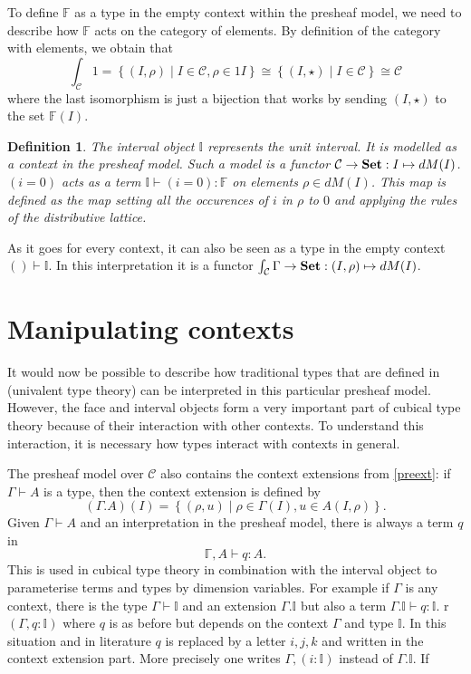 \documentclass[12pt,a4paper,twoside,xetex,draft]{book}
\newcommand{\keyword}[1]{\emph{#1}\index{#1}}
\newtheorem{definition}[theorem]{Definition}
\begin{document}
To define $\mathbb{F}$ as a type in the empty context within the presheaf model, we need to describe how $\mathbb{F}$ acts on the category of elements. By definition of the category with elements, we obtain that $$\int_{\mathcal{C}} 1 = \left\{ (I, \rho ) \mid I \in \mathcal{C}, \rho \in 1I \right\} \cong \left\{ (I, \star ) \mid I \in \mathcal{C} \right\}  \cong \mathcal{C}$$ where the last isomorphism is just a bijection that works by sending $(I, \star )$ to the set $\mathbb{F}(I)$.


\begin{definition}\label{interval}
The \keyword{interval object} $\mathbb{I}$ represents the unit interval. It is modelled as a context in the presheaf model. Such a model is a functor $\mathcal{C} \rightarrow \text{\textbf{Set}} : I \mapsto dM(I)$.  $(i=0)$ acts as a term $\mathbb{I} \vdash (i = 0) : \mathbb{F}$ on elements $\rho \in dM (I)$. This map is defined as the map setting all the occurences of $i$ in $\rho$ to $0$ and applying the rules of the distributive lattice.
\end{definition}

As it goes for every context, it can also be seen as a type in the empty context $() \vdash \mathbb{I}$. 
In this interpretation it is a functor  $\int_{\mathcal{C}} \Gamma \rightarrow \text{\textbf{Set}} : (I,\rho) \mapsto dM(I)$.



\section{Manipulating contexts}

It would now be possible to describe how traditional types that are defined in (univalent type theory) can be interpreted in this particular presheaf model. However, the face and interval objects form a very important part of cubical type theory because of their interaction with other contexts. To understand this interaction, it is necessary how types interact with contexts in general.  

The presheaf model over $\mathcal{C}$ also contains the context extensions from \cref{preext}: if $\Gamma \vdash A$ is a type, then the context extension is defined by $$(\Gamma . A)(I) = \left\{ (\rho , u ) \mid \rho \in \Gamma (I), u \in A (I,\rho) \right\}.$$
Given $\Gamma \vdash A$ and an interpretation in the presheaf model, there is always a term $q$ in $$\mathbb{\Gamma}, A \vdash q : A.$$ This is used in cubical type theory in combination with the interval object to parameterise terms and types by dimension variables. For example if $\Gamma$ is any context, there is the type $\Gamma \vdash \mathbb{I}$ and an extension $\Gamma. \mathbb{I}$ but also a term $\Gamma. \mathbb{I} \vdash q : \mathbb{I}$.
r $(\Gamma, q : \mathbb{I})$ where $q$ is as before but depends on the context $\Gamma$ and type $\mathbb{I}$. In this situation and in literature $q$ is replaced by a letter $i,j,k$ and written in the context extension part. More precisely one writes $\Gamma, (i: \mathbb{I})$ instead of $\Gamma . \mathbb{I}$. If 
\end{document}
